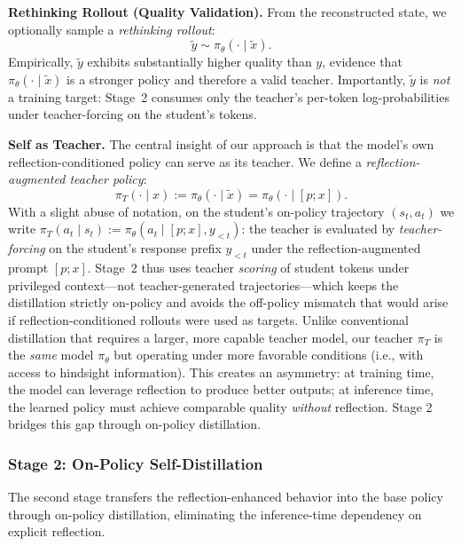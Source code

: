 \documentclass{article}
\theoremstyle{plain}
\theoremstyle{definition}
\theoremstyle{remark}
\begin{document}
\textbf{Rethinking Rollout (Quality Validation).}
From the reconstructed state, we optionally sample a \emph{rethinking rollout}:
\begin{equation}
\tilde{y} \sim \pi_\theta(\cdot\mid\tilde{x}).
\end{equation}
Empirically, $\tilde{y}$ exhibits substantially higher quality than $y$, evidence that $\pi_\theta(\cdot\mid\tilde{x})$ is a stronger policy and therefore a valid teacher.
Importantly, $\tilde{y}$ is \emph{not} a training target: Stage~2 consumes only the teacher's per-token log-probabilities under teacher-forcing on the student's tokens.

\textbf{Self as Teacher.}
The central insight of our approach is that the model's own reflection-conditioned policy can serve as its teacher.
We define a \emph{reflection-augmented teacher policy}:
\begin{equation}
\pi_T(\cdot\mid x) := \pi_\theta(\cdot\mid\tilde{x}) = \pi_\theta(\cdot\mid[p;x]).
\label{eq:teacher}
\end{equation}
With a slight abuse of notation, on the student's on-policy trajectory $(s_t,a_t)$ we write $\pi_T(a_t\mid s_t):=\pi_\theta(a_t\mid [p;x], y_{<t})$: the teacher is evaluated by \emph{teacher-forcing} on the student's response prefix $y_{<t}$ under the reflection-augmented prompt $[p;x]$. Stage~2 thus uses teacher \emph{scoring} of student tokens under privileged context---not teacher-generated trajectories---which keeps the distillation strictly on-policy and avoids the off-policy mismatch that would arise if reflection-conditioned rollouts were used as targets.
Unlike conventional distillation that requires a larger, more capable teacher model, our teacher $\pi_T$ is the \emph{same} model $\pi_\theta$ but operating under more favorable conditions (i.e., with access to hindsight information).
This creates an asymmetry: at training time, the model can leverage reflection to produce better outputs; at inference time, the learned policy must achieve comparable quality \emph{without} reflection.
Stage 2 bridges this gap through on-policy distillation.


\subsubsection{Stage 2: On-Policy Self-Distillation}
\label{sec:stage2}

The second stage transfers the reflection-enhanced behavior into the base policy through on-policy distillation, eliminating the inference-time dependency on explicit reflection.
\end{document}
